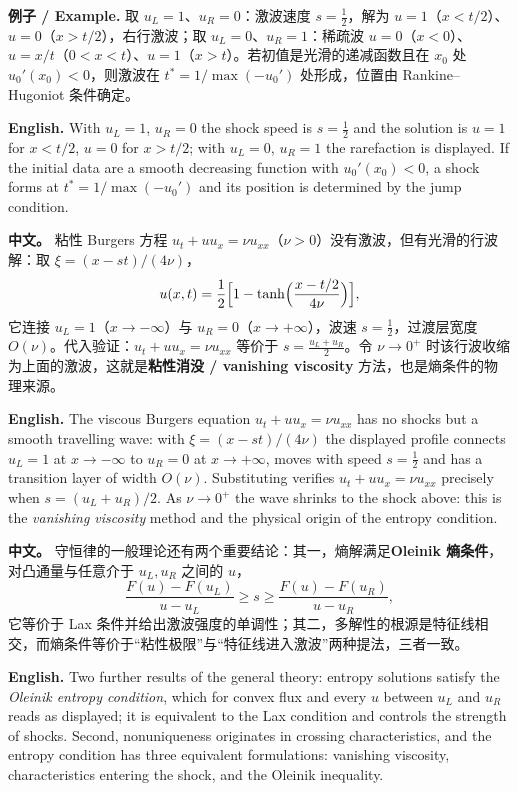 \documentclass[UTF8,11pt,a4paper]{ctexart}
\newcommand{\APS}[2]{\par\noindent\textbf{中文。} #1\par\noindent\textbf{English.} #2\par\smallskip}
\newcommand{\EN}[1]{\par\noindent \textbf{English.} #1\par}
\newcommand{\EX}[2]{\par\noindent \textbf{例子 / Example.} #1\par\EN{#2}}
\begin{document}
\EX{取 $u_L=1$、$u_R=0$：激波速度 $s=\frac12$，解为 $u=1$（$x<t/2$）、$u=0$（$x>t/2$），右行激波；取 $u_L=0$、$u_R=1$：稀疏波 $u=0$（$x<0$）、$u=x/t$（$0<x<t$）、$u=1$（$x>t$）。若初值是光滑的递减函数且在 $x_0$ 处 $u_0'(x_0)<0$，则激波在 $t^*=1/\max(-u_0')$ 处形成，位置由 Rankine--Hugoniot 条件确定。}{With $u_L=1$, $u_R=0$ the shock speed is $s=\frac12$ and the solution is $u=1$ for $x<t/2$, $u=0$ for $x>t/2$; with $u_L=0$, $u_R=1$ the rarefaction is displayed. If the initial data are a smooth decreasing function with $u_0'(x_0)<0$, a shock forms at $t^*=1/\max(-u_0')$ and its position is determined by the jump condition.}

\APS{粘性 Burgers 方程 $u_t+uu_x=\nu u_{xx}$（$\nu>0$）没有激波，但有光滑的行波解：取 $\xi=(x-st)/(4\nu)$，
\[
u(x,t)=\frac12\Bigl[1-\tanh\Bigl(\frac{x-t/2}{4\nu}\Bigr)\Bigr],
\]
它连接 $u_L=1$（$x\to-\infty$）与 $u_R=0$（$x\to+\infty$），波速 $s=\frac12$，过渡层宽度 $O(\nu)$。代入验证：$u_t+uu_x=\nu u_{xx}$ 等价于 $s=\frac{u_L+u_R}{2}$。令 $\nu\to0^+$ 时该行波收缩为上面的激波，这就是\textbf{粘性消没 / vanishing viscosity} 方法，也是熵条件的物理来源。}{The viscous Burgers equation $u_t+uu_x=\nu u_{xx}$ has no shocks but a smooth travelling wave: with $\xi=(x-st)/(4\nu)$ the displayed profile connects $u_L=1$ at $x\to-\infty$ to $u_R=0$ at $x\to+\infty$, moves with speed $s=\frac12$ and has a transition layer of width $O(\nu)$. Substituting verifies $u_t+uu_x=\nu u_{xx}$ precisely when $s=(u_L+u_R)/2$. As $\nu\to0^+$ the wave shrinks to the shock above: this is the \emph{vanishing viscosity} method and the physical origin of the entropy condition.}

\APS{守恒律的一般理论还有两个重要结论：其一，熵解满足\textbf{Oleinik 熵条件}，对凸通量与任意介于 $u_L,u_R$ 之间的 $u$，
\[
\frac{F(u)-F(u_L)}{u-u_L}\ge s\ge\frac{F(u)-F(u_R)}{u-u_R},
\]
它等价于 Lax 条件并给出激波强度的单调性；其二，多解性的根源是特征线相交，而熵条件等价于``粘性极限''与``特征线进入激波''两种提法，三者一致。}{Two further results of the general theory: entropy solutions satisfy the \emph{Oleinik entropy condition}, which for convex flux and every $u$ between $u_L$ and $u_R$ reads as displayed; it is equivalent to the Lax condition and controls the strength of shocks. Second, nonuniqueness originates in crossing characteristics, and the entropy condition has three equivalent formulations: vanishing viscosity, characteristics entering the shock, and the Oleinik inequality.}
\end{document}

